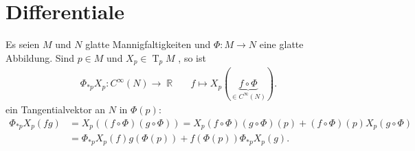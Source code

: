 \documentclass[paper=A4, twoside, chapterprefix=true, bibliography=totoc, headsepline]{scrbook}
\DeclareMathOperator{\R}{\mathbb{R}}
\DeclareMathOperator{\T}{T} %
\theoremstyle{plain}
\theoremstyle{nonumberplain}
\theoremstyle{empty}
\theoremstyle{break}
\begin{document}



\chapter{Differentiale}
Es seien $M$ und $N$ glatte Mannigfaltigkeiten und $\Phi \colon M \to N$ eine glatte Abbildung.
Sind $p \in M$ und $X_p \in \T_pM$ , so ist 
\begin{align*}
	\Phi_{*p}X_p \colon C^{\infty}(N) \to \R && f \mapsto X_p(\underbrace{f \circ \Phi}_{\in C^{\infty}(N)}).
\end{align*}
ein Tangentialvektor an $N$ in $\Phi(p)$:
\begin{align*}
	\Phi_{*p}X_p(fg) & = X_p((f \circ \Phi)(g \circ \Phi)) = X_p(f \circ \Phi)(g \circ \Phi)(p) + (f \circ \Phi)(p)X_p(g \circ \Phi)\\
	& = \Phi_{*p}X_p(f)g(\Phi(p)) + f(\Phi(p)) \Phi_{*p}X_p(g).
\end{align*}
\end{document}
